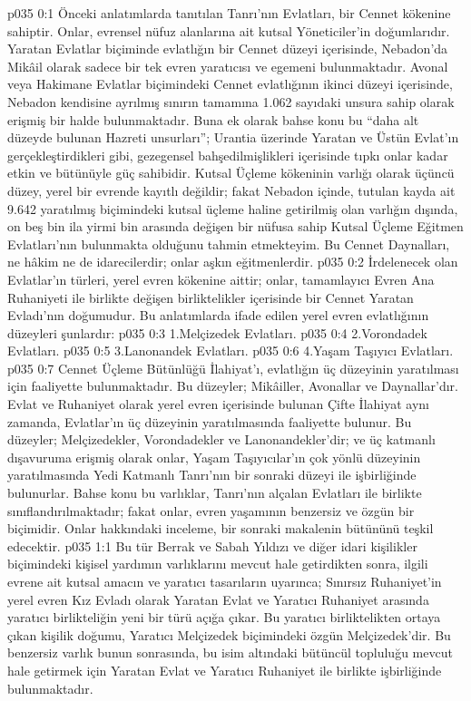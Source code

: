 \vs p035 0:1 Önceki anlatımlarda tanıtılan Tanrı’nın Evlatları, bir Cennet kökenine sahiptir. Onlar, evrensel nüfuz alanlarına ait kutsal Yöneticiler’in doğumlarıdır. Yaratan Evlatlar biçiminde evlatlığın bir Cennet düzeyi içerisinde, Nebadon’da Mikâil olarak sadece bir tek evren yaratıcısı ve egemeni bulunmaktadır. Avonal veya Hakimane Evlatlar biçimindeki Cennet evlatlığının ikinci düzeyi içerisinde, Nebadon kendisine ayrılmış sınırın tamamına 1.062 sayıdaki unsura sahip olarak erişmiş bir halde bulunmaktadır. Buna ek olarak bahse konu bu “daha alt düzeyde bulunan Hazreti unsurları”; Urantia üzerinde Yaratan ve Üstün Evlat’ın gerçekleştirdikleri gibi, gezegensel bahşedilmişlikleri içerisinde tıpkı onlar kadar etkin ve bütünüyle güç sahibidir. Kutsal Üçleme kökeninin varlığı olarak üçüncü düzey, yerel bir evrende kayıtlı değildir; fakat Nebadon içinde, tutulan kayda ait 9.642 yaratılmış biçimindeki kutsal üçleme haline getirilmiş olan varlığın dışında, on beş bin ila yirmi bin arasında değişen bir nüfusa sahip Kutsal Üçleme Eğitmen Evlatları’nın bulunmakta olduğunu tahmin etmekteyim. Bu Cennet Daynalları, ne hâkim ne de idarecilerdir; onlar aşkın eğitmenlerdir.
\vs p035 0:2 İrdelenecek olan Evlatlar’ın türleri, yerel evren kökenine aittir; onlar, tamamlayıcı Evren Ana Ruhaniyeti ile birlikte değişen birliktelikler içerisinde bir Cennet Yaratan Evladı’nın doğumudur. Bu anlatımlarda ifade edilen yerel evren evlatlığının düzeyleri şunlardır:
\vs p035 0:3 1.\bibnobreakspace Melçizedek Evlatları.
\vs p035 0:4 2.\bibnobreakspace Vorondadek Evlatları.
\vs p035 0:5 3.\bibnobreakspace Lanonandek Evlatları.
\vs p035 0:6 4.\bibnobreakspace Yaşam Taşıyıcı Evlatları.
\vs p035 0:7 Cennet Üçleme Bütünlüğü İlahiyat’ı, evlatlığın üç düzeyinin yaratılması için faaliyette bulunmaktadır. Bu düzeyler; Mikâiller, Avonallar ve Daynallar’dır. Evlat ve Ruhaniyet olarak yerel evren içerisinde bulunan Çifte İlahiyat aynı zamanda, Evlatlar’ın üç düzeyinin yaratılmasında faaliyette bulunur. Bu düzeyler; Melçizedekler, Vorondadekler ve Lanonandekler’dir; ve üç katmanlı dışavuruma erişmiş olarak onlar, Yaşam Taşıyıcılar’ın çok yönlü düzeyinin yaratılmasında Yedi Katmanlı Tanrı’nın bir sonraki düzeyi ile işbirliğinde bulunurlar. Bahse konu bu varlıklar, Tanrı’nın alçalan Evlatları ile birlikte sınıflandırılmaktadır; fakat onlar, evren yaşamının benzersiz ve özgün bir biçimidir. Onlar hakkındaki inceleme, bir sonraki makalenin bütününü teşkil edecektir.
\vs p035 1:1 Bu tür Berrak ve Sabah Yıldızı ve diğer idari kişilikler biçimindeki kişisel yardımın varlıklarını mevcut hale getirdikten sonra, ilgili evrene ait kutsal amacın ve yaratıcı tasarıların uyarınca; Sınırsız Ruhaniyet’in yerel evren Kız Evladı olarak Yaratan Evlat ve Yaratıcı Ruhaniyet arasında yaratıcı birlikteliğin yeni bir türü açığa çıkar. Bu yaratıcı birliktelikten ortaya çıkan kişilik doğumu, Yaratıcı Melçizedek biçimindeki özgün Melçizedek’dir. Bu benzersiz varlık bunun sonrasında, bu isim altındaki bütüncül topluluğu mevcut hale getirmek için Yaratan Evlat ve Yaratıcı Ruhaniyet ile birlikte işbirliğinde bulunmaktadır.
